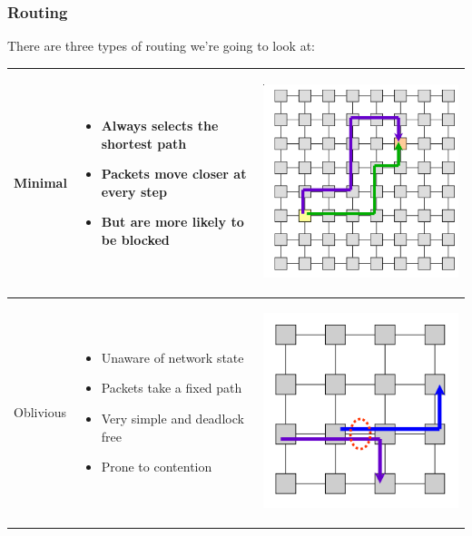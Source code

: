 \subsubsection{Routing}

There are three types of routing we're going to look at:

\begin{center}
  \begin{tabular}{| m{2cm} | m{5cm} | c |}
    \hline
    Minimal &
    \begin{itemize}
      \item Always selects the shortest path
      \item Packets move closer at every step
      \item But are more likely to be blocked
    \end{itemize} & 
    \begin{minipage}{.3\textwidth}
      \begin{center}
        \includegraphics[width=0.5\linewidth]{images/minimal}
      \end{center}
    \end{minipage} \\ \hline
    Oblivious &
    \begin{itemize}
      \item Unaware of network state
      \item Packets take a fixed path
      \item Very simple and deadlock free
      \item Prone to contention
    \end{itemize} & 
    \begin{minipage}{.3\textwidth}
      \begin{center}
        \includegraphics[width=0.5\linewidth]{images/oblivious}

\end{center}
\end{minipage}
\end{tabular}
\end{center}
